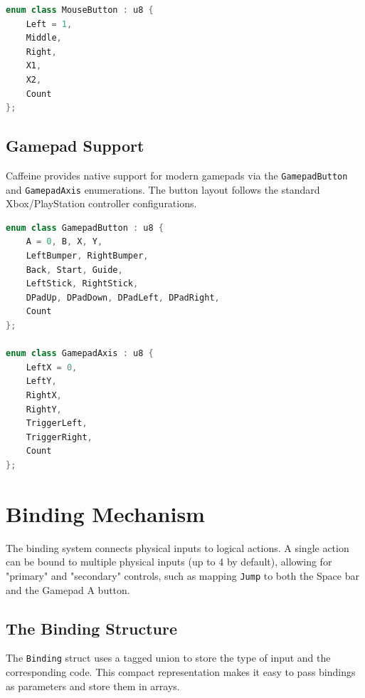 \begin{lstlisting}[language=C++]
enum class MouseButton : u8 {
    Left = 1,
    Middle,
    Right,
    X1,
    X2,
    Count
};
\end{lstlisting}

\subsection{Gamepad Support}

Caffeine provides native support for modern gamepads via the \texttt{GamepadButton} and \texttt{GamepadAxis} enumerations. The button layout follows the standard Xbox/PlayStation controller configurations.

\begin{lstlisting}[language=C++]
enum class GamepadButton : u8 {
    A = 0, B, X, Y,
    LeftBumper, RightBumper,
    Back, Start, Guide,
    LeftStick, RightStick,
    DPadUp, DPadDown, DPadLeft, DPadRight,
    Count
};

enum class GamepadAxis : u8 {
    LeftX = 0,
    LeftY,
    RightX,
    RightY,
    TriggerLeft,
    TriggerRight,
    Count
};
\end{lstlisting}


\section{Binding Mechanism}

The binding system connects physical inputs to logical actions. A single action can be bound to multiple physical inputs (up to 4 by default), allowing for "primary" and "secondary" controls, such as mapping \texttt{Jump} to both the Space bar and the Gamepad A button.

\subsection{The Binding Structure}

The \texttt{Binding} struct uses a tagged union to store the type of input and the corresponding code. This compact representation makes it easy to pass bindings as parameters and store them in arrays.

